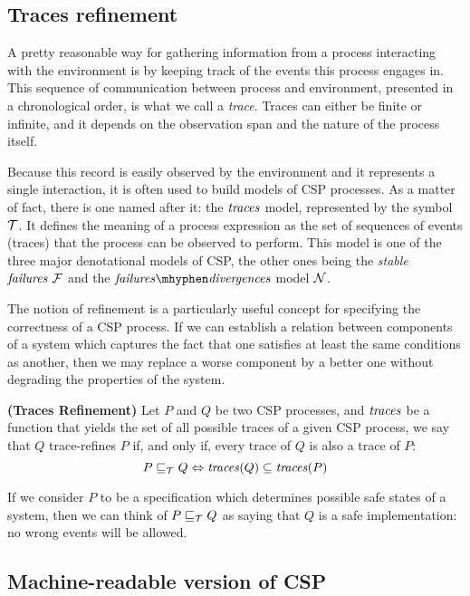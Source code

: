 \subsection{Traces refinement}
\label{subsection:traces-refinement}

A pretty reasonable way for gathering information from a process interacting with the environment is by keeping track of the events this process engages in. This sequence of communication between process and environment, presented in a chronological order, is what we call a \emph{trace}. Traces can either be finite or infinite, and it depends on the observation span and the nature of the process itself.

Because this record is easily observed by the environment and it represents a single interaction, it is often used to build models of CSP processes. As a matter of fact, there is one named after it: the $ \mathit{\traces} $ model, represented by the symbol $ \tmodel $. It defines the meaning of a process expression as the set of sequences of events (traces) that the process can be observed to perform. This model is one of the three major denotational models of CSP, the other ones being the \emph{stable} $ \mathit{\failures} \ \fmodel $ and the $ \mathit{\failures \mhyphen \divergences} $ model $ \nmodel $.

The notion of refinement is a particularly useful concept for specifying the correctness of a CSP process. If we can establish a relation between components of a system which captures the fact that one satisfies at least the same conditions as another, then we may replace a worse component by a better one without degrading the properties of the system.

\begin{definition}{\textbf{(Traces Refinement)}}
	Let $ P $ and $ Q $ be two CSP processes, and $ \mathit{\traces} $ be a function that yields the set of all possible traces of a given CSP process, we say that $ Q $ trace-refines $ P $ if, and only if, every trace of $ Q $ is also a trace of $ P $:
	\[  P \refinedby[\tmodel] Q \iff \mathit{\traces}(Q) \subseteq \mathit{\traces}(P) \]
\end{definition}

If we consider $ P $ to be a specification which determines possible safe states of a system, then we can think of $ P \refinedby[\tmodel] Q $ as saying that $ Q $ is a safe implementation: no wrong events will be allowed.

\subsection{Machine-readable version of CSP}

